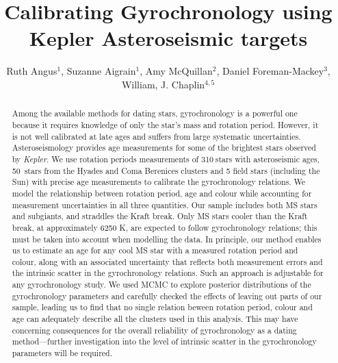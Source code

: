 \documentclass[11pt,preprint]{aastex}
\newcommand{\nastero}{310}
\newcommand{\nHC}{50~}
\begin{document}
\title{Calibrating Gyrochronology using Kepler Asteroseismic targets}

\author{Ruth Angus$^1$, Suzanne Aigrain$^1$, Amy McQuillan$^2$, Daniel Foreman-Mackey$^3$,  William, J. Chaplin$^{4, 5}$}

\begin{abstract}
\label{abs}

Among the available methods for dating stars, gyrochronology is a powerful one because it requires knowledge of only the star's mass and rotation period.
However, it is not well calibrated at late ages and suffers from large systematic uncertainties.
Asteroseismology provides age measurements for some of the brightest stars observed by {\it Kepler}.
We use rotation periods measurements of \nastero$~$stars with asteroseismic ages, \nHC stars from the Hyades and Coma Berenices clusters and 5 field stars (including the Sun) with precise age measurements to calibrate the gyrochronology relations.
We model the relationship between rotation period, age and colour while accounting for measurement uncertainties in all three quantities.
Our sample includes both MS stars and subgiants, and straddles the Kraft break.
Only MS stars cooler than the Kraft break, at approximately 6250 K, are expected to follow gyrochronology relations; this must be taken into account when modelling the data.
In principle, our method enables us to estimate an age for any cool MS star with a measured rotation period and colour, along with an associated uncertainty that reflects both measurement errors and the intrinsic scatter in the gyrochronology relations.
Such an approach is adjustable for any gyrochronology study.
We used MCMC to explore posterior distributions of the gyrochronology parameters and carefully checked the effects of leaving out parts of our sample, leading us to find that no single relation beween rotation period, colour and age can adequately describe all the clusters used in this analysis.
This may have concerning consequences for the overall reliability of gyrochronology as a dating method---further investigation into the level of intrinsic scatter in the gyrochronology parameters will be required.

\end{abstract}
\end{document}
